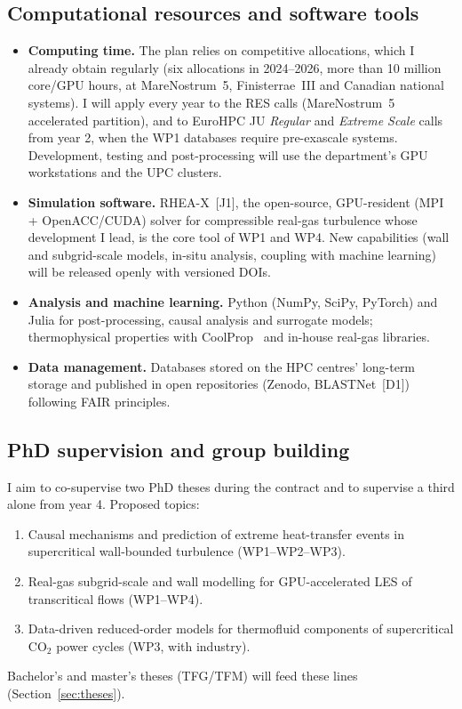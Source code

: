 \documentclass[11pt]{article}
\begin{document}
\subsection{Computational resources and software tools}\label{sec:computing}
\begin{itemize}
\item \textbf{Computing time.} The plan relies on competitive allocations, which I already
obtain regularly (six allocations in 2024--2026, more than 10 million core/GPU hours, at
MareNostrum~5, Finisterrae~III and Canadian national systems). I will apply every year to
the RES calls (MareNostrum~5 accelerated partition), and to EuroHPC JU \emph{Regular} and
\emph{Extreme Scale} calls from year 2, when the WP1 databases require pre-exascale
systems. Development, testing and post-processing will use the department's GPU
workstations and the UPC clusters.
\item \textbf{Simulation software.} RHEA-X~[J1], the open-source, GPU-resident (MPI +
OpenACC/CUDA) solver for compressible real-gas turbulence whose development I lead, is
the core tool of WP1 and WP4. New capabilities (wall and subgrid-scale models, in-situ
analysis, coupling with machine learning) will be released openly with versioned DOIs.
\item \textbf{Analysis and machine learning.} Python (NumPy, SciPy, PyTorch) and Julia for
post-processing, causal analysis and surrogate models; thermophysical properties with
CoolProp~\cite{CoolProp2014} and in-house real-gas libraries.
\item \textbf{Data management.} Databases stored on the HPC centres' long-term storage and
published in open repositories (Zenodo, BLASTNet~[D1]) following FAIR principles.
\end{itemize}

\subsection{PhD supervision and group building}
I aim to co-supervise two PhD theses during the contract and to supervise a third alone
from year 4. Proposed topics:
\begin{enumerate}
\item Causal mechanisms and prediction of extreme heat-transfer events in supercritical
wall-bounded turbulence (WP1--WP2--WP3).
\item Real-gas subgrid-scale and wall modelling for GPU-accelerated LES of transcritical
flows (WP1--WP4).
\item Data-driven reduced-order models for thermofluid components of supercritical CO$_2$
power cycles (WP3, with industry).
\end{enumerate}
Bachelor's and master's theses (TFG/TFM) will feed these lines
(Section~\ref{sec:theses}).
\end{document}

